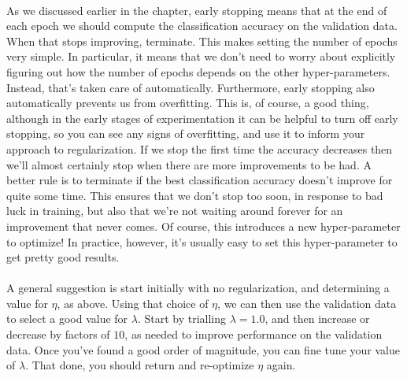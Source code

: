 \paragraph{} As we discussed earlier in the chapter, early stopping means that at the end of each epoch we should compute the classification accuracy on the validation data. When that stops improving, terminate. This makes setting the number of epochs very simple. In particular, it means that we don't need to worry about explicitly figuring out how the number of epochs depends on the other hyper-parameters. Instead, that's taken care of automatically. Furthermore, early stopping also automatically prevents us from overfitting. This is, of course, a good thing, although in the early stages of experimentation it can be helpful to turn off early stopping, so you can see any signs of overfitting, and use it to inform your approach to regularization. If we stop the first time the accuracy decreases then we'll almost certainly stop when there are more improvements to be had. A better rule is to terminate if the best classification accuracy doesn't improve for quite some time. This ensures that we don't stop too soon, in response to bad luck in training, but also that we're not waiting around forever for an improvement that never comes. Of course, this introduces a new hyper-parameter to optimize! In practice, however, it's usually easy to set this hyper-parameter to get pretty good results.

\paragraph{} A general suggestion is start initially with no regularization, and determining a value for $\eta$, as above. Using that choice of $\eta$, we can then use the validation data to select a good value for $\lambda$. Start by trialling $\lambda=1.0$, and then increase or decrease by factors of $10$, as needed to improve performance on the validation data. Once you've found a good order of magnitude, you can fine tune your value of $\lambda$. That done, you should return and re-optimize $\eta$  again.

